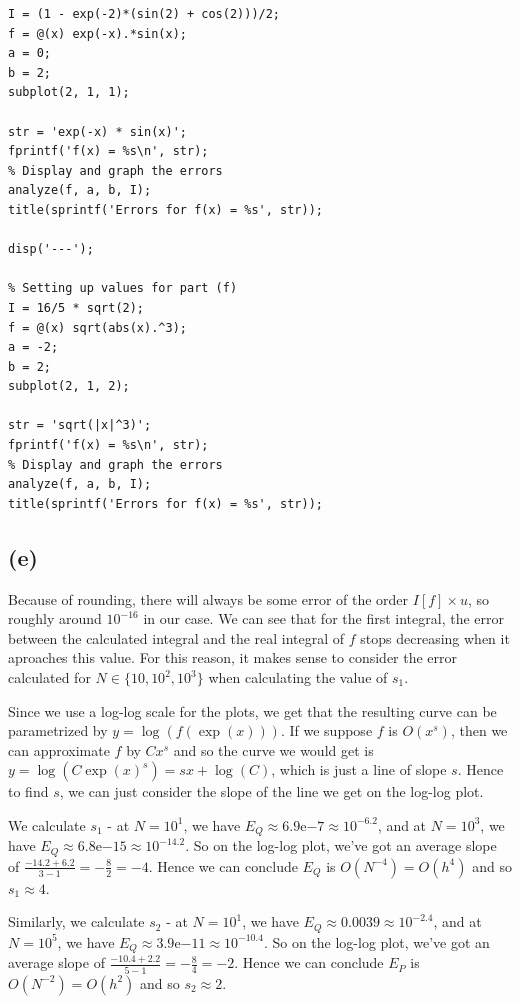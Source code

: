 \documentclass{article}
\begin{document}
\begin{Verbatim}[frame=single,
   label=\textsc{Matlab} code - main.m]
% Setting up values for part (d)
I = (1 - exp(-2)*(sin(2) + cos(2)))/2;
f = @(x) exp(-x).*sin(x);
a = 0;
b = 2;
subplot(2, 1, 1);

str = 'exp(-x) * sin(x)';
fprintf('f(x) = %s\n', str);
% Display and graph the errors
analyze(f, a, b, I);
title(sprintf('Errors for f(x) = %s', str));

disp('---');

% Setting up values for part (f)
I = 16/5 * sqrt(2);
f = @(x) sqrt(abs(x).^3);
a = -2;
b = 2;
subplot(2, 1, 2);

str = 'sqrt(|x|^3)';
fprintf('f(x) = %s\n', str);
% Display and graph the errors
analyze(f, a, b, I);
title(sprintf('Errors for f(x) = %s', str));
\end{Verbatim}



\subsection*{(e)}
Because of rounding, there will always be some
error of the order
$I[f]\times u$,
so roughly around $10^{-16}$ in our case. We can see that
for the first integral, the
error between the calculated integral and the real integral of $f$
stops decreasing when it aproaches this value. For this reason,
it makes sense to consider the error calculated for
$N \in \{10, 10^2, 10^3\}$ when calculating the value of $s_1$.

Since we use a log-log scale for the plots, we get that the 
resulting curve can be parametrized by
$y = \log(f(\exp(x)))$.
If we suppose $f$ is $O(x^s)$, then we can approximate $f$ by
$Cx^s$ and so the curve we would get is
$y = \log(C\exp(x)^s) = sx + \log(C)$,
which is just a line of slope $s$. Hence to find $s$, we can just
consider the slope of the line we get on the log-log plot.

We calculate $s_1$ - at $N = 10^1$, we have
$E_Q \approx 6.9\textrm{e}{-7} \approx 10^{-6.2}$, and at
$N = 10^3$, we have
$E_Q \approx 6.8\textrm{e}{-15} \approx 10^{-14.2}$.
So on the log-log plot, we've got an average slope of
$\frac{-14.2 + 6.2}{3 - 1} = -\frac{8}{2} = -4$.
Hence we can conclude $E_Q$ is $O(N^{-4}) = O(h^4)$
and so $s_1 \approx 4$.

Similarly, we calculate $s_2$ - at $N = 10^1$, we have
$E_Q \approx 0.0039 \approx 10^{-2.4}$, and at
$N = 10^5$, we have
$E_Q \approx 3.9\textrm{e}{-11} \approx 10^{-10.4}$.
So on the log-log plot, we've got an average slope of
$\frac{-10.4 + 2.2}{5 - 1} = -\frac{8}{4} = -2$.
Hence we can conclude $E_P$ is $O(N^{-2}) = O(h^2)$
and so $s_2 \approx 2$.
\end{document}
